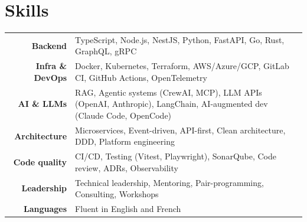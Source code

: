 \section{Skills}

\noindent
\begin{tabular}{@{} r @{\hspace{4mm}} p{} @{}}
    \textbf{Backend}        & TypeScript, Node.js, NestJS, Python, FastAPI, Go, Rust, GraphQL, gRPC \\[2mm]
    \textbf{Infra \& DevOps}  & Docker, Kubernetes, Terraform, AWS/Azure/GCP, GitLab CI, GitHub Actions, OpenTelemetry \\[2mm]
    \textbf{AI \& LLMs}      & RAG, Agentic systems (CrewAI, MCP), LLM APIs (OpenAI, Anthropic), LangChain, AI-augmented dev (Claude Code, OpenCode) \\[2mm]
    \textbf{Architecture}   & Microservices, Event-driven, API-first, Clean architecture, DDD, Platform engineering \\[2mm]
    \textbf{Code quality}   & CI/CD, Testing (Vitest, Playwright), SonarQube, Code review, ADRs, Observability \\[2mm]
    \textbf{Leadership}     & Technical leadership, Mentoring, Pair-programming, Consulting, Workshops \\[2mm]
    \textbf{Languages}      & Fluent in English and French \\
\end{tabular}
